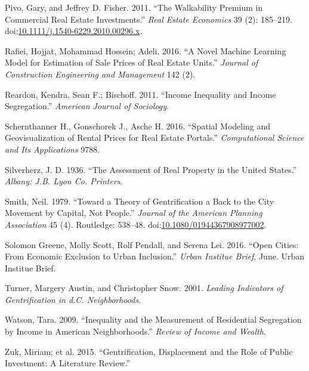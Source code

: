 \documentclass[]{article}
\begin{document}
\hypertarget{ref-Pivo2011}{}
Pivo, Gary, and Jeffrey D. Fisher. 2011. ``The Walkability Premium in
Commercial Real Estate Investments.'' \emph{Real Estate Economics} 39
(2): 185--219.
doi:\href{https://doi.org/10.1111/j.1540-6229.2010.00296.x}{10.1111/j.1540-6229.2010.00296.x}.

\hypertarget{ref-Rafiei2016}{}
Rafiei, Hojjat, Mohammad Hossein; Adeli. 2016. ``A Novel Machine
Learning Model for Estimation of Sale Prices of Real Estate Units.''
\emph{Journal of Construction Engineering and Management} 142 (2).

\hypertarget{ref-Reardon2011}{}
Reardon, Kendra, Sean F.; Bischoff. 2011. ``Income Inequality and Income
Segregation.'' \emph{American Journal of Sociology}.

\hypertarget{ref-Schernthanner2016}{}
Schernthanner H., Gonschorek J., Asche H. 2016. ``Spatial Modeling and
Geovisualization of Rental Prices for Real Estate Portals.''
\emph{Computational Science and Its Applications} 9788.

\hypertarget{ref-Silverherz1936}{}
Silverherz, J. D. 1936. ``The Assessment of Real Property in the United
States.'' \emph{Albany: J.B. Lyon Co. Printers}.

\hypertarget{ref-Smith1979}{}
Smith, Neil. 1979. ``Toward a Theory of Gentrification a Back to the
City Movement by Capital, Not People.'' \emph{Journal of the American
Planning Association} 45 (4). Routledge: 538--48.
doi:\href{https://doi.org/10.1080/01944367908977002}{10.1080/01944367908977002}.

\hypertarget{ref-urban2016}{}
Solomon Greene, Molly Scott, Rolf Pendall, and Serena Lei. 2016. ``Open
Cities: From Economic Exclusion to Urban Inclusion.'' \emph{Urban
Institue Brief}, June. Urban Institue Brief.

\hypertarget{ref-Turner2001}{}
Turner, Margery Austin, and Christopher Snow. 2001. \emph{Leading
Indicators of Gentrification in d.C. Neighborhoods}.

\hypertarget{ref-Watson2009}{}
Watson, Tara. 2009. ``Inequality and the Measurement of Residential
Segregation by Income in American Neighborhoods.'' \emph{Review of
Income and Wealth}.

\hypertarget{ref-Zuk2015}{}
Zuk, Miriam; et al. 2015. ``Gentrification, Displacement and the Role of
Public Investment: A Literature Review.''
\end{document}
